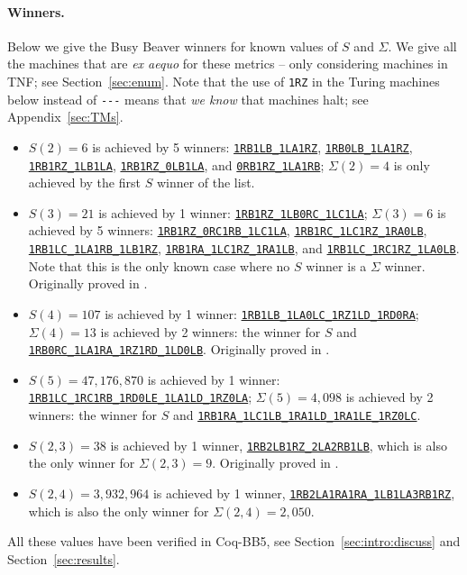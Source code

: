 \documentclass[letterpaper,british,11pt]{article}
\theoremstyle{definition} %
\numberwithin{equation}{section}
\theoremstyle{definition} %
\newcommand{\tm}[1]{\href{https://bbchallenge.org/#1}{\texttt{\nolinkurl{#1}}}}
\newcommand{\BBtheFifth}{47{,}176{,}870}
\newcommand{\BBTxF}{3{,}932{,}964}
\newcommand{\CoqBB}{Coq-BB5\xspace}
\begin{document}
\paragraph{Winners.} Below we give the Busy Beaver winners for known values of $S$ and $\Sigma$. We give all the machines that are \textit{ex aequo} for these metrics -- only considering machines in TNF; see Section~\ref{sec:enum}. Note that the use of \texttt{1RZ} in the Turing machines below instead of \verb|---| means that \textit{we know} that machines halt; see Appendix~\ref{sec:TMs}.
\begin{itemize}
    \item $S(2) = 6$ is achieved by 5 winners: \tm{1RB1LB_1LA1RZ}, \tm{1RB0LB_1LA1RZ}, \tm{1RB1RZ_1LB1LA}, \tm{1RB1RZ_0LB1LA}, and \tm{0RB1RZ_1LA1RB}; $\Sigma(2) = 4$ is only achieved by the first $S$ winner of the list.
    \item $S(3) = 21$ is achieved by 1 winner: \tm{1RB1RZ_1LB0RC_1LC1LA}; $\Sigma(3) = 6$ is achieved by 5 winners: \tm{1RB1RZ_0RC1RB_1LC1LA}, \tm{1RB1RC_1LC1RZ_1RA0LB}, \tm{1RB1LC_1LA1RB_1LB1RZ}, \tm{1RB1RA_1LC1RZ_1RA1LB}, and \tm{1RB1LC_1RC1RZ_1LA0LB}. Note that this is the only known case where no $S$ winner is a $\Sigma$ winner. Originally proved in \cite{Lin1963}.
    \item $S(4) = 107$ is achieved by 1 winner: \tm{1RB1LB_1LA0LC_1RZ1LD_1RD0RA}; $\Sigma(4) = 13$ is achieved by 2 winners: the winner for $S$ and \tm{1RB0RC_1LA1RA_1RZ1RD_1LD0LB}. Originally proved in \cite{Brady83}.
    \item $S(5) = \BBtheFifth$ is achieved by 1 winner: \tm{1RB1LC_1RC1RB_1RD0LE_1LA1LD_1RZ0LA}; $\Sigma(5) = 4{,}098$ is achieved by 2 winners: the winner for $S$ and \tm{1RB1RA_1LC1LB_1RA1LD_1RA1LE_1RZ0LC}.
    \item $S(2,3) = 38$ is achieved by 1 winner, \tm{1RB2LB1RZ_2LA2RB1LB}, which is also the only winner for $\Sigma(2,3) = 9$. Originally proved in \cite{LafittePapazian2007}.
    \item $S(2,4) = \BBTxF$ is achieved by 1 winner, \tm{1RB2LA1RA1RA_1LB1LA3RB1RZ}, which is also the only winner for $\Sigma(2,4)=2{,}050$.
\end{itemize}

All these values have been verified in \CoqBB, see Section~\ref{sec:intro:discuss} and Section~\ref{sec:results}.
\end{document}
